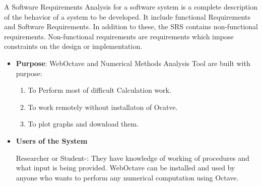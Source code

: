 
A Software Requirements Analysis for a software system is a complete 
description of the behavior of a system to be developed. It include functional Requirements
and Software Requirements. In addition to these, the SRS contains 
non-functional requirements. Non-functional requirements are 
requirements which impose constraints on the design or implementation.
\begin{itemize}
\item{\bf Purpose}: WebOctave and Numerical Methods Analysis Tool are built with purpose:
\begin{enumerate}
\item  To Perform most of difficult Calculation work.
\item To work remotely without installaton of Ocatve.
\item To plot graphs and download them.
\end{enumerate}
\newpage
\item{\bf Users of the System}

 Researcher or Student-: They have knowledge of working of procedures and what input is being provided.  
WebOctave can be installed and used by anyone who wants to perform any numerical computation using Octave.



\end{itemize}
